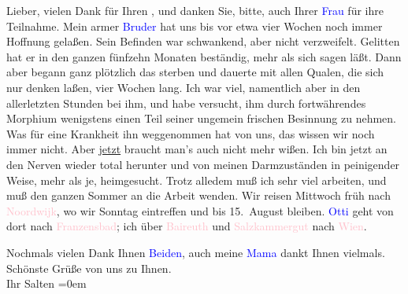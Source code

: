 \pstart
           Lieber, vielen Dank für Ihren \label{K_L03497-1v}\label{K_L03497-1h}, und danken Sie, bitte, auch Ihrer \label{K_L03497-2v}\label{K_L03497-2h}{ }\textcolor{blue}{Frau}{}\ledrightnote{{$\rightarrow$}\textcolor{blue}{Olga Schnitzler}} für ihre Teilnahme. Mein
               armer \textcolor{blue}{Bruder}{}\ledrightnote{{$\rightarrow$}\textcolor{blue}{Michael Emil Salzmann}} hat uns bis vor
               etwa vier Wochen noch immer Hoffnung gelaßen. Sein Befinden war schwankend, aber
               nicht verzweifelt. Gelitten hat er in den ganzen fünfzehn Monaten beständig, mehr als
               sich sagen läßt. Dann aber begann ganz plötzlich das sterben und dauerte mit allen
               Qualen, die sich nur denken laßen, vier Wochen lang. Ich war viel, namentlich aber in
               den allerletzten Stunden bei ihm, und habe versucht, ihm durch fortwährendes Morphium
               wenigstens einen Teil seiner ungemein frischen Besinnung zu nehmen. Was für eine
               Krankheit ihn weggenommen hat von uns, das wissen wir noch immer nicht. Aber \uline{jetzt} braucht man’s auch nicht mehr wißen. Ich bin
               jetzt an den Nerven wieder total herunter und von meinen Darmzuständen in peinigender
               Weise, mehr als je, heimgesucht. Trotz alledem muß ich sehr viel arbeiten, und muß
               den ganzen Sommer an die Arbeit wenden. Wir reisen Mittwoch{ }früh nach \textcolor{pink}{Noordwijk}{}\ledrightnote{\textcolor{pink}{Noordwijk}}, wo wir Sonntag eintreffen und bis 15. August bleiben. \textcolor{blue}{Otti}{}\ledrightnote{\textcolor{blue}{Ottilie Salten}} geht von
               dort nach \textcolor{pink}{Franzensbad}{}\ledrightnote{\textcolor{pink}{Franzensbad}}; ich über \textcolor{pink}{Baireuth}{}\ledrightnote{\textcolor{pink}{Bayreuth}} und \textcolor{pink}{Salzkammergut}{}\ledrightnote{\textcolor{pink}{Salzkammergut}}
               nach \textcolor{pink}{Wien}{}\ledrightnote{\textcolor{pink}{Wien}}.\pend
           
\pstart
           Nochmals vielen Dank Ihnen \textcolor{blue}{Beiden}{}\ledrightnote{{$\rightarrow$}\textcolor{blue}{Olga Schnitzler}}, auch meine \textcolor{blue}{Mama}{}\ledrightnote{{$\rightarrow$}\textcolor{blue}{Marie Salzmann}} dankt Ihnen vielmals. Schönste Grüße von uns zu Ihnen. {\\[\baselineskip]}Ihr
                  \spacefill\mbox{Salten}\pend
           \leftskip=0em{}\endnumbering{}  
      